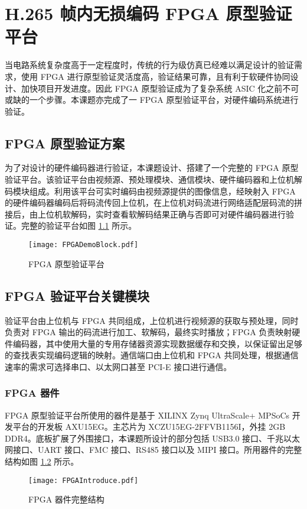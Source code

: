 \chapter{H.265 帧内无损编码 FPGA 原型验证平台}
\label{cha:c5}
当电路系统复杂度高于一定程度时，传统的行为级仿真已经难以满足设计的验证需求，使用 FPGA 进行原型验证灵活度高，验证结果可靠，且有利于软硬件协同设计、加快项目开发进度。因此 FPGA 原型验证成为了复杂系统 ASIC 化之前不可或缺的一个步骤。本课题亦完成了一 FPGA 原型验证平台，对硬件编码系统进行验证。

\section{FPGA 原型验证方案}
为了对设计的硬件编码器进行验证，本课题设计、搭建了一个完整的 FPGA 原型验证平台。该验证平台由视频源、预处理模块、通信模块、硬件编码器和上位机解码模块组成。利用该平台可实时编码由视频源提供的图像信息，经映射入 FPGA 的硬件编码器编码后将码流传回上位机，在上位机对码流进行网络适配层码流的拼接后，由上位机软解码，实时查看软解码结果正确与否即可对硬件编码器进行验证。完整的验证平台如图 \ref{fig:FPGADemoBlock} 所示。
\begin{figure}[hbt]
    \centering
    \texttt{[image: FPGADemoBlock.pdf]}
    \caption{FPGA 原型验证平台}
    \label{fig:FPGADemoBlock}
\end{figure}

\section{FPGA 验证平台关键模块}
验证平台由上位机与 FPGA 共同组成，上位机进行视频源的获取与预处理，同时负责对 FPGA 输出的码流进行加工、软解码，最终实时播放；FPGA 负责映射硬件编码器，其中使用大量的专用存储器资源实现数据缓存和交换，以保证留出足够的查找表实现编码逻辑的映射。通信端口由上位机和 FPGA 共同处理，根据通信速率的需求可选择串口、以太网口甚至 PCI-E 接口进行通信。
\subsection{FPGA 器件}
FPGA 原型验证平台所使用的器件是基于 XILINX Zynq UltraScale+ MPSoCs 开发平台的开发板 AXU15EG。主芯片为 XCZU15EG-2FFVB1156I，外挂 2GB DDR4。底板扩展了外围接口，本课题所设计的部分包括 USB3.0 接口、千兆以太网接口、UART 接口、FMC 接口、RS485 接口以及 MIPI 接口。所用器件的完整结构如图 \ref{fig:FPGAIntroduce} 所示。
\begin{figure}[hbt]
    \centering
    \texttt{[image: FPGAIntroduce.pdf]}
    \caption{FPGA 器件完整结构}
    \label{fig:FPGAIntroduce}
\end{figure}

